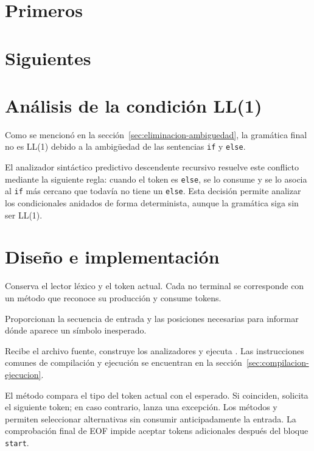 \section{Primeros}


\clearpage
\section{Siguientes}


\section{Análisis de la condición LL(1)}
Como se mencionó en la sección~\ref{sec:eliminacion-ambiguedad},
la gramática final no es LL(1) debido a la ambigüedad de las
sentencias \texttt{if} y \texttt{else}.

El analizador sintáctico predictivo descendente recursivo resuelve
este conflicto mediante la siguiente regla: cuando el
token es \texttt{else}, se lo consume y se lo
asocia al \texttt{if} más cercano que todavía no tiene un
\texttt{else}. Esta decisión permite analizar los condicionales
anidados de forma determinista, aunque la gramática siga sin
ser LL(1).

\section{Diseño e implementación}
\begin{description}[style=nextline]
  \item[\lexcode{SyntacticAnalyzer}]
  Conserva el lector léxico y el token actual. Cada no terminal se
  corresponde con un método que reconoce su producción y consume tokens.
  \item[\lexcode{Lexer} y \lexcode{Token}]
  Proporcionan la secuencia de entrada y las posiciones necesarias para
  informar dónde aparece un símbolo inesperado.
  \item[\lexcode{Etapa2}]
  Recibe el archivo fuente, construye los analizadores y ejecuta
  . Las instrucciones comunes de compilación y ejecución
  se encuentran en la sección~\ref{sec:compilacion-ejecucion}.
\end{description}

El método  compara el tipo del token actual con el
esperado. Si coinciden, solicita el siguiente token; en caso contrario,
lanza una excepción. Los métodos  y
 permiten seleccionar alternativas sin consumir
anticipadamente la entrada. La comprobación final de EOF impide aceptar
tokens adicionales después del bloque \texttt{start}.

